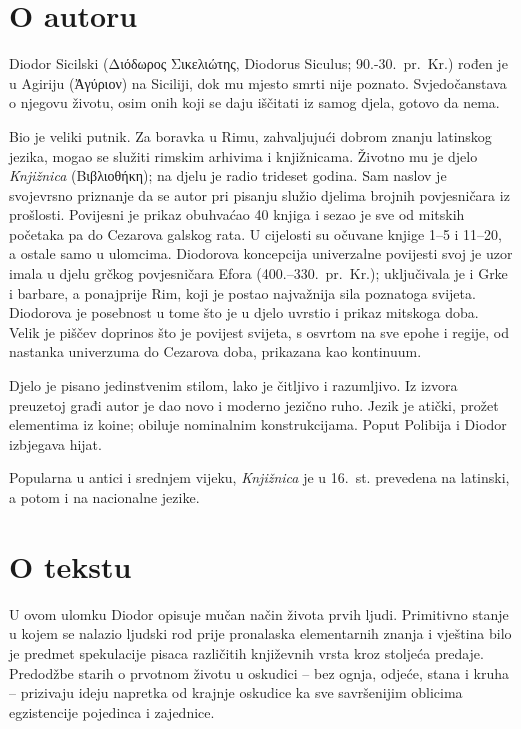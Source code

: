 \section*{O autoru}

Diodor Sicilski \textgreek[variant=ancient]{(Διόδωρος Σικελιώτης,} Diodorus Siculus; 90.-30.\ pr.~Kr.) rođen je u Agiriju \textgreek[variant=ancient]{(Ἀγύριον)} na Siciliji, dok mu mjesto smrti nije poznato. Svjedočanstava o njegovu životu, osim onih koji se daju iščitati iz samog djela, gotovo da nema. 

Bio je veliki putnik. Za boravka u Rimu, zahvaljujući dobrom znanju latinskog jezika, mogao se služiti rimskim arhivima i knjižnicama. Životno mu je djelo \textit{Knjižnica} \textgreek[variant=ancient]{(Βιβλιοθήκη)}; na djelu je radio trideset godina. Sam naslov je svojevrsno priznanje da se autor pri pisanju služio djelima brojnih povjesničara iz prošlosti.  Povijesni je prikaz obuhvaćao 40 knjiga i sezao je sve od mitskih početaka pa do Cezarova galskog rata. U cijelosti su očuvane knjige 1–5 i 11–20, a ostale samo u ulomcima. Diodorova koncepcija univerzalne povijesti svoj je uzor imala u djelu grčkog povjesničara Efora (400.–330.\ pr.~Kr.); uključivala je i Grke i barbare, a ponajprije Rim, koji je postao najvažnija sila poznatoga svijeta. Diodorova je posebnost u tome što je u djelo uvrstio i prikaz mitskoga doba. Velik je piščev doprinos što je povijest svijeta, s osvrtom na sve epohe i regije, od nastanka univerzuma do Cezarova doba, prikazana kao kontinuum.

Djelo je pisano jedinstvenim stilom, lako je čitljivo i razumljivo. Iz izvora preuzetoj građi autor je dao novo i moderno jezično ruho. Jezik je atički, prožet elementima iz koine; obiluje nominalnim konstrukcijama. Poput Polibija i Diodor izbjegava hijat. 

Popularna u antici i srednjem vijeku, \textit{Knjižnica} je u 16.~st. prevedena na latinski, a potom i na nacionalne jezike.

\section*{O tekstu}

U ovom ulomku Diodor opisuje mučan način života prvih ljudi. Primitivno stanje u kojem se nalazio ljudski rod prije pronalaska elementarnih znanja i vještina bilo je predmet spekulacije pisaca različitih književnih vrsta kroz stoljeća predaje. Predodžbe starih o prvotnom životu u oskudici – bez ognja, odjeće, stana i kruha – prizivaju ideju napretka od krajnje oskudice ka sve savršenijim oblicima egzistencije pojedinca i zajednice.

